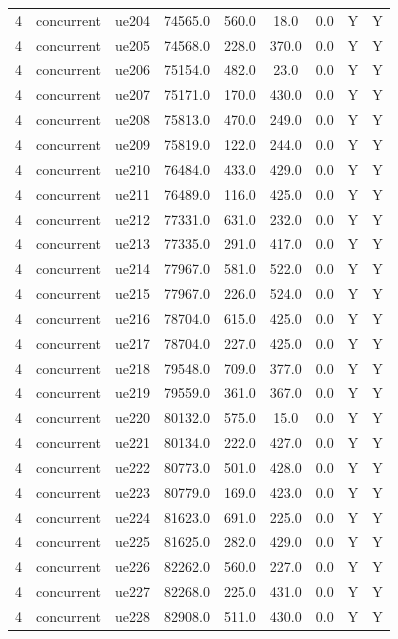 \begin{table}[ht]
\begin{tabular}{|c|c|c|c|c|c|c|c|c|}
4 & concurrent & ue204 & 74565.0 & 560.0 & 18.0 & 0.0 & Y & Y \\
4 & concurrent & ue205 & 74568.0 & 228.0 & 370.0 & 0.0 & Y & Y \\
4 & concurrent & ue206 & 75154.0 & 482.0 & 23.0 & 0.0 & Y & Y \\
4 & concurrent & ue207 & 75171.0 & 170.0 & 430.0 & 0.0 & Y & Y \\
4 & concurrent & ue208 & 75813.0 & 470.0 & 249.0 & 0.0 & Y & Y \\
4 & concurrent & ue209 & 75819.0 & 122.0 & 244.0 & 0.0 & Y & Y \\
4 & concurrent & ue210 & 76484.0 & 433.0 & 429.0 & 0.0 & Y & Y \\
4 & concurrent & ue211 & 76489.0 & 116.0 & 425.0 & 0.0 & Y & Y \\
4 & concurrent & ue212 & 77331.0 & 631.0 & 232.0 & 0.0 & Y & Y \\
4 & concurrent & ue213 & 77335.0 & 291.0 & 417.0 & 0.0 & Y & Y \\
4 & concurrent & ue214 & 77967.0 & 581.0 & 522.0 & 0.0 & Y & Y \\
4 & concurrent & ue215 & 77967.0 & 226.0 & 524.0 & 0.0 & Y & Y \\
4 & concurrent & ue216 & 78704.0 & 615.0 & 425.0 & 0.0 & Y & Y \\
4 & concurrent & ue217 & 78704.0 & 227.0 & 425.0 & 0.0 & Y & Y \\
4 & concurrent & ue218 & 79548.0 & 709.0 & 377.0 & 0.0 & Y & Y \\
4 & concurrent & ue219 & 79559.0 & 361.0 & 367.0 & 0.0 & Y & Y \\
4 & concurrent & ue220 & 80132.0 & 575.0 & 15.0 & 0.0 & Y & Y \\
4 & concurrent & ue221 & 80134.0 & 222.0 & 427.0 & 0.0 & Y & Y \\
4 & concurrent & ue222 & 80773.0 & 501.0 & 428.0 & 0.0 & Y & Y \\
4 & concurrent & ue223 & 80779.0 & 169.0 & 423.0 & 0.0 & Y & Y \\
4 & concurrent & ue224 & 81623.0 & 691.0 & 225.0 & 0.0 & Y & Y \\
4 & concurrent & ue225 & 81625.0 & 282.0 & 429.0 & 0.0 & Y & Y \\
4 & concurrent & ue226 & 82262.0 & 560.0 & 227.0 & 0.0 & Y & Y \\
4 & concurrent & ue227 & 82268.0 & 225.0 & 431.0 & 0.0 & Y & Y \\
4 & concurrent & ue228 & 82908.0 & 511.0 & 430.0 & 0.0 & Y & Y \\

\end{tabular}
\end{table}
